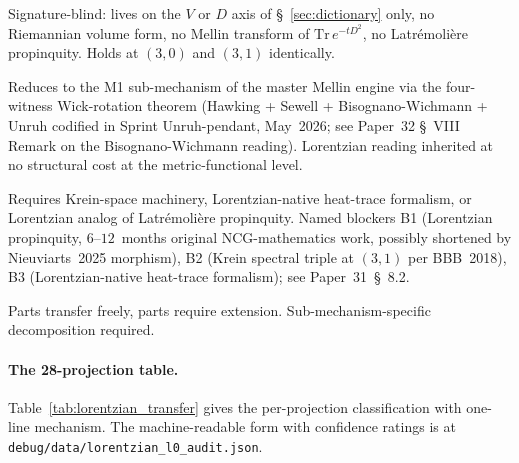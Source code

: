 \documentclass[11pt]{article}
\begin{document}
\begin{description}
\setlength\itemsep{2pt}
\item[\textsc{transfers freely (TF)}.]  Signature-blind: lives on the
$V$ or $D$ axis of \S~\ref{sec:dictionary} only, no Riemannian volume
form, no Mellin transform of $\mathrm{Tr}\,e^{-tD^2}$, no Latr\'emoli\`ere
propinquity.  Holds at $(3, 0)$ and $(3, 1)$ identically.
\item[\textsc{wick-map free (WMF)}.]  Reduces to the M1 sub-mechanism
of the master Mellin engine via the four-witness Wick-rotation
theorem (Hawking + Sewell + Bisognano-Wichmann + Unruh codified in
Sprint Unruh-pendant, May~2026; see Paper~32 \S~VIII Remark on the
Bisognano-Wichmann reading).  Lorentzian reading inherited at no
structural cost at the metric-functional level.
\item[\textsc{euclidean specific (ES)}.]  Requires Krein-space
machinery, Lorentzian-native heat-trace formalism, or Lorentzian
analog of Latr\'emoli\`ere propinquity.  Named blockers B1
(Lorentzian propinquity, $6$--$12$~months original NCG-mathematics
work, possibly shortened by Nieuviarts~2025 morphism), B2 (Krein
spectral triple at $(3, 1)$ per BBB~2018), B3 (Lorentzian-native
heat-trace formalism); see Paper~31~\S~8.2.
\item[\textsc{mixed (M)}.]  Parts transfer freely, parts require
extension.  Sub-mechanism-specific decomposition required.
\end{description}

\paragraph{The 28-projection table.}
Table~\ref{tab:lorentzian_transfer} gives the per-projection
classification with one-line mechanism.  The machine-readable form
with confidence ratings is at
\texttt{debug/data/lorentzian\_l0\_audit.json}.
\end{document}
